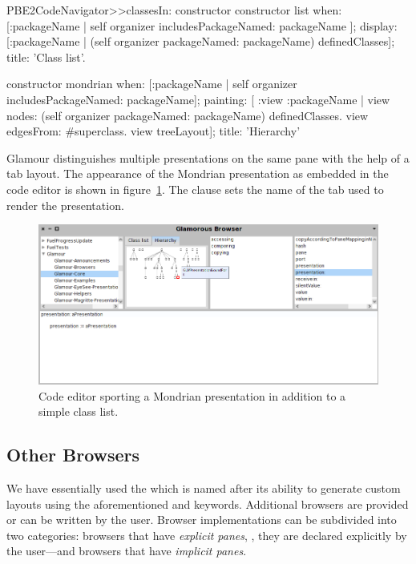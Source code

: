 \documentclass[a4paper,10pt,twoside]{book}
\begin{document}
\begin{code}{}
PBE2CodeNavigator>>classesIn: constructor
  constructor list
    when: [:packageName | self organizer includesPackageNamed: packageName ];
    display: [:packageName | (self organizer packageNamed: packageName)
                    definedClasses];
    title: 'Class list'.

  constructor mondrian 
    when: [:packageName | self organizer includesPackageNamed: packageName];
    painting: [ :view :packageName | 
          view nodes: (self organizer packageNamed:  packageName)  
                             definedClasses.
          view edgesFrom:  #superclass.
          view treeLayout];
    title: 'Hierarchy' 
\end{code}

Glamour distinguishes multiple presentations on the same pane with the
help of a tab layout. The appearance of the Mondrian presentation as
embedded in the code editor is shown in
figure~\ref{fig:mondrian-presentation}. The clause  sets
the name of the tab used to render the presentation.

\begin{figure}[htbp]
\centerline{\includegraphics[width=\linewidth]{mondrian-presentation.png}}
\caption{Code editor sporting a Mondrian presentation in addition to a simple class list.}
\label{fig:mondrian-presentation}
\end{figure}


\subsection{Other Browsers}

We have essentially used the 
which is named after its ability to generate custom layouts using the
aforementioned  and  keywords. Additional
browsers are provided or can be written by the user. Browser
implementations can be subdivided into two categories: browsers that
have \emph{explicit panes}, \ie{}, they are declared explicitly by the
user---and browsers that have \emph{implicit panes}.
\end{document}
